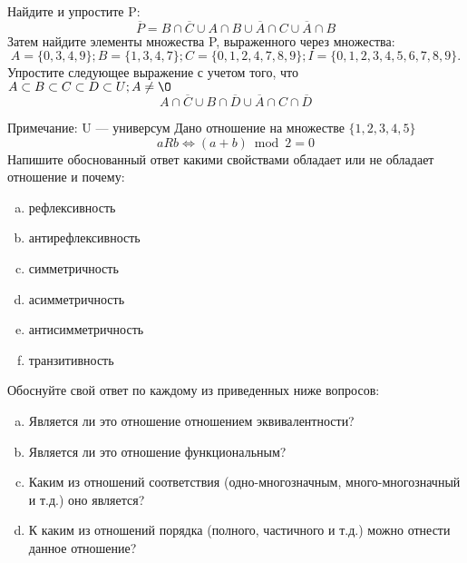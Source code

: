 \documentclass[10pt]{exam}
\begin{document}
\begin{questions}
\question
Найдите и упростите P:
\begin{equation*}
\overline{P} = B \cap \overline{C} \cup A \cap B \cup \overline{A} \cap C \cup \overline{A} \cap B
\end{equation*}
Затем найдите элементы множества P, выраженного через множества:
\begin{equation*}
A = \{0, 3, 4, 9\}; 
B = \{1, 3, 4, 7\};
C = \{0, 1, 2, 4, 7, 8, 9\};
I = \{0, 1, 2, 3, 4, 5, 6, 7, 8, 9\}.
\end{equation*}\question
Упростите следующее выражение с учетом того, что $A\subset B \subset C \subset D \subset U; A \neq \O$
\begin{equation*}
A \cap  \overline{C} \cup B \cap \overline{D} \cup  \overline{A} \cap C \cap  \overline{D}
\end{equation*}

Примечание: U — универсум\question
Дано отношение на множестве $\{1, 2, 3, 4, 5\}$ 
\begin{equation*}
aRb \iff (a+b) \bmod 2 =0
\end{equation*}
Напишите обоснованный ответ какими свойствами обладает или не обладает отношение и почему:   
\begin{enumerate} [a)]\setcounter{enumi}{0}
\item рефлексивность
\item антирефлексивность
\item симметричность
\item асимметричность
\item антисимметричность
\item транзитивность
\end{enumerate}

Обоснуйте свой ответ по каждому из приведенных ниже вопросов:
\begin{enumerate} [a)]\setcounter{enumi}{0}
    \item Является ли это отношение отношением эквивалентности?
    \item Является ли это отношение функциональным?
    \item Каким из отношений соответствия (одно-многозначным, много-многозначный и т.д.) оно является?
    \item К каким из отношений порядка (полного, частичного и т.д.) можно отнести данное отношение?
\end{enumerate}




\end{questions}
\end{document}
